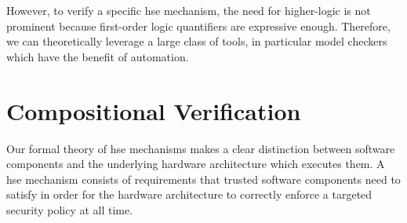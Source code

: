 %

%
However, to verify a specific \ac{hse} mechanism, the need for higher-logic is
not prominent because first-order logic quantifiers are expressive enough.
%
Therefore, we can theoretically leverage a large class of tools, in particular
model checkers which have the benefit of automation.

\section{Compositional Verification}
\label{section:sota:compsec}


Our formal theory of \ac{hse} mechanisms makes a clear distinction between
software components and the underlying hardware architecture which executes
them.
%
A \ac{hse} mechanism consists of requirements that trusted software components
need to satisfy in order for the hardware architecture to correctly enforce a
targeted security policy at all time.

